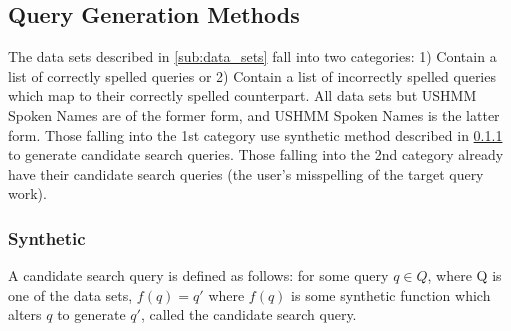 \documentclass{article}
\begin{document}
\subsection{Query Generation Methods} %
\label{sub:query_generation_methods}
The data sets described in \ref{sub:data_sets} fall into two categories: 1) Contain a list of correctly spelled queries or 2) Contain a list of incorrectly spelled queries which map to their correctly spelled counterpart.  All data sets but USHMM Spoken Names are of the former form, and USHMM Spoken Names is the latter form.  Those falling into the 1st category use synthetic method described in \ref{ssub:synthetic} to generate candidate search queries.  Those falling into the 2nd category already have their candidate search queries (the user's misspelling of the target query work).

\subsubsection{Synthetic} %
\label{ssub:synthetic}
A candidate search query is defined as follows: for some query $q \in Q$, where Q is one of the data sets, $f(q) = q'$ where $f(q)$ is some synthetic function which alters $q$ to generate $q'$, called the candidate search query.  
\end{document}
